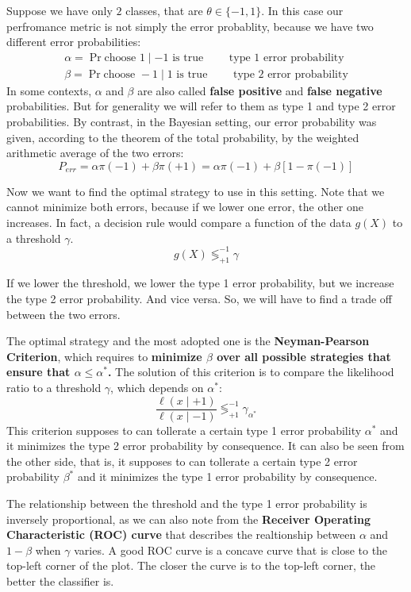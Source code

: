 Suppose we have only $2$ classes, that are $\theta \in \{-1, 1\}$. In this case our perfromance metric is not simply the error probablity, because we have two different error probabilities:
\begin{gather*}
    \alpha = \Pr{\text{choose } 1 \mid -1\text{ is true}} \qquad \text{ type 1 error probability} \\
    \beta = \Pr{\text{choose } -1 \mid 1\text{ is true}} \qquad \text{ type 2 error probability}
\end{gather*}
In some contexts, $\alpha$ and $\beta$ are also called \textbf{false positive} and \textbf{false negative} probabilities. But for generality we will refer to them as type 1 and type 2 error probabilities.
By contrast, in the Bayesian setting, our error probability was given, according to the theorem of the total probability, by the weighted arithmetic average of the two errors:
\[
    P_{err} = \alpha \pi(-1) + \beta \pi(+1) = \alpha \pi(-1) + \beta [1-\pi(-1)]
\]

Now we want to find the optimal strategy to use in this setting. Note that we cannot minimize both errors, because if we lower one error, the other one increases.
In fact, a decision rule would compare a function of the data $g(X)$ to a threshold $\gamma$.
\[
    g(X) \lessgtr^{-1}_{+1} \gamma
\]

If we lower the threshold, we lower the type 1 error probability, but we increase the type 2 error probability. And vice versa.
So, we will have to find a trade off between the two errors.

The optimal strategy and the most adopted one is the \textbf{Neyman-Pearson Criterion}, which requires to \textbf{minimize $\beta$ over all possible strategies that ensure that $\alpha \leq \alpha^\ast$.}
The solution of this criterion is to compare the likelihood ratio to a threshold $\gamma$, which depends on $\alpha^\ast$:
\[
    \frac{\ell(x \mid +1)}{\ell(x \mid -1)} \lessgtr^{-1}_{+1} \gamma_{\alpha^\ast}
\]
This criterion supposes to can tollerate a certain type 1 error probability $\alpha^\ast$ and it minimizes the type 2 error probability by consequence. It can also be seen from the other side, that is, it supposes to can tollerate a certain type 2 error probability $\beta^\ast$ and it minimizes the type 1 error probability by consequence.

The relationship between the threshold and the type 1 error probability is inversely proportional, as we can also note from the \textbf{Receiver Operating Characteristic (ROC) curve} that describes the realtionship between $\alpha$ and $1-\beta$ when $\gamma$ varies.
A good ROC curve is a concave curve that is close to the top-left corner of the plot. The closer the curve is to the top-left corner, the better the classifier is.

